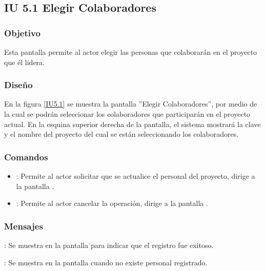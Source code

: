 \subsection{IU 5.1 Elegir Colaboradores}

\subsubsection{Objetivo}
	Esta pantalla permite al actor elegir las personas que colaborarán en el proyecto que él lidera.
\subsubsection{Diseño}
	En la figura \ref{IU5.1} se muestra la pantalla ''Elegir Colaboradores'', por medio de la cual se podrán seleccionar los colaboradores que participarán en el proyecto actual. En la esquina superior derecha de la pantalla, el sistema mostrará la clave y el nombre del proyecto del cual se están seleccionando los colaboradores.

\label{IU5.1}
\subsubsection{Comandos}
\begin{itemize}
	\item {}: Permite al actor solicitar que se actualice el personal del proyecto, dirige a la pantalla .
	\item {}: Permite al actor cancelar la operación, dirige a la pantalla .
\end{itemize}

\subsubsection{Mensajes}

\begin{Citemize}
	\item {}: Se muestra en la pantalla  para indicar que el registro fue exitoso.
	\item {}: Se muestra en la pantalla  cuando no existe personal registrado.
\end{Citemize}

\label{IU5-1A}
